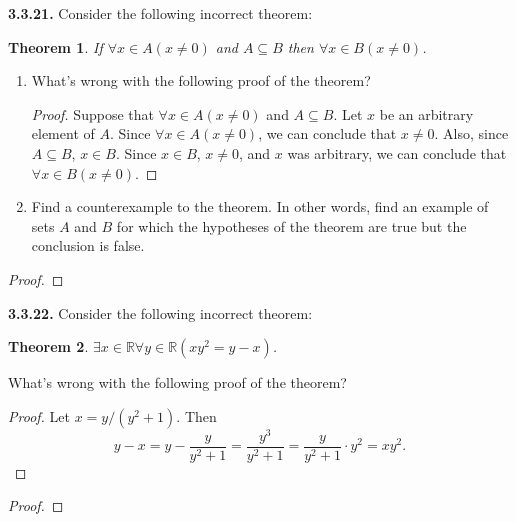 \documentclass[12pt]{amsart}
\newenvironment{statement}[1]{\smallskip\noindent\color[rgb]{.6627, .3529, .6314} {\bf #1.}}{}
\newtheorem{theorem}{Theorem}
\theoremstyle{definition}
\theoremstyle{remark}
\newcommand{\BR}{\mathbb R}
\begin{document}
\begin{statement}{3.3.21}
Consider the following incorrect theorem:
\begin{theorem}
	If $\forall x \in A (x \neq 0)$ and $A \subseteq B$ then $\forall x \in B (x \neq 0)$.
\end{theorem}
\begin{enumerate}
	\item What's wrong with the following proof of the theorem?
	\begin{proof}
		Suppose that $\forall x \in A (x \neq 0)$ and $A \subseteq B$.
		Let $x$ be an arbitrary element of $A$.
		Since $\forall x \in A (x \neq 0)$, we can conclude that $x \neq 0$.
		Also, since $A \subseteq B$, $x \in B$.
		Since $x \in B$, $x \neq 0$, and $x$ was arbitrary, 
		we can conclude that $\forall x \in B (x \neq 0)$.
	\end{proof}
	
	\item Find a counterexample to the theorem.
	In other words, find an example of sets $A$ and $B$ for which the hypotheses of the theorem
	are true but the conclusion is false.
\end{enumerate}
\end{statement}

\begin{proof}
\end{proof}


\begin{statement}{3.3.22}
Consider the following incorrect theorem:
\begin{theorem}
	$\exists x \in \BR \forall y \in \BR (xy^2 = y - x)$.
\end{theorem}
What's wrong with the following proof of the theorem?
\begin{proof}
	Let $x = y / (y^2 + 1)$. Then
	\begin{equation*}
		y - x
		= y - \frac{y}{y^2 + 1}
		= \frac{y^3}{y^2 + 1}
		= \frac{y}{y^2 + 1} \cdot y^2
		= xy^2.
	\end{equation*}
\end{proof}
\end{statement}

\begin{proof}
\end{proof}
\end{document}
